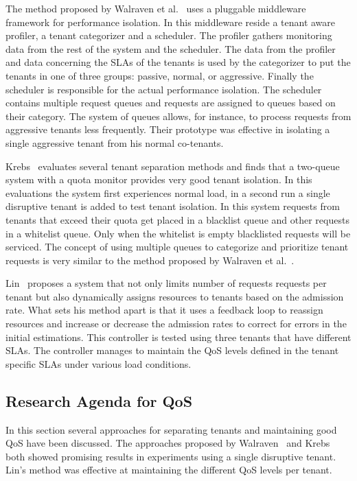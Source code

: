 The method proposed by Walraven et al.~\cite{walraven2012towards} uses a pluggable middleware framework for performance isolation.
In this middleware reside a tenant aware profiler, a tenant categorizer and a scheduler. 
The profiler gathers monitoring data from the rest of the system and the scheduler.
The data from the profiler and data concerning the \acp{SLA} of the tenants is used by the categorizer to put the tenants in one of three groups: passive, normal, or aggressive.
Finally the scheduler is responsible for the actual performance isolation.
The scheduler contains multiple request queues and requests are assigned to queues based on their category.
The system of queues allows, for instance, to process requests from aggressive tenants less frequently.
Their prototype was effective in isolating a single aggressive tenant from his normal co-tenants.

Krebs~\cite{krebs2013metrics} evaluates several tenant separation methods and finds that a two-queue system with a quota monitor provides very good tenant isolation.
In this evaluations the system first experiences normal load, in a second run a single disruptive tenant is added to test tenant isolation.
In this system requests from tenants that exceed their quota get placed in a blacklist queue and other requests in a whitelist queue. 
Only when the whitelist is empty blacklisted requests will be serviced.
The concept of using multiple queues to categorize and prioritize tenant requests is very similar to the method proposed by Walraven et al.~\cite{walraven2012towards}.

Lin~\cite{lin2009feedback} proposes a system that not only limits number of requests requests per tenant but also dynamically assigns resources to tenants based on the admission rate.
What sets his method apart is that it uses a feedback loop to reassign resources and increase or decrease the admission rates to correct for errors in the initial estimations.
This controller is tested using three tenants that have different \acp{SLA}. 
The controller manages to maintain the \ac{QoS} levels defined in the tenant specific \acp{SLA} under various load conditions.

\subsection{Research Agenda for \ac{QoS}}\label{sec:qos_agenda}
In this section several approaches for separating tenants and maintaining good \ac{QoS} have been discussed.
The approaches proposed by Walraven~\cite{walraven2012towards} and Krebs~\cite{krebs2013metrics} both showed promising results in experiments using a single disruptive tenant.
Lin's method was effective at maintaining the different \ac{QoS} levels per tenant.

